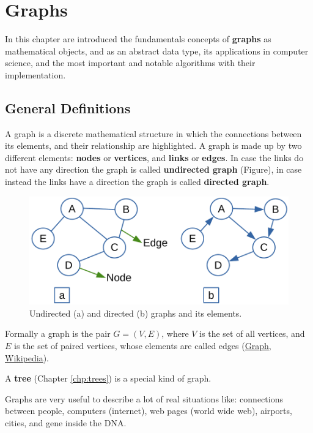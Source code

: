 \chapter{Graphs}
\label{chp:graphs}
In this chapter are introduced the fundamentals concepts of \textbf{graphs} as mathematical objects, and as an abstract data type, its applications in computer science, and the most important and notable algorithms with their implementation. 
 
\section{General Definitions}
A graph is a discrete mathematical structure in which the connections between its elements, and their relationship are highlighted. A graph is made up by two different elements: \textbf{nodes} or \textbf{vertices}, and \textbf{links} or \textbf{edges}. In case the links do not have any direction the graph is called \textbf{undirected graph} (Figure), in case instead the links have a direction the graph is called \textbf{directed graph}.

\begin{figure}[H]
	\begin{center}
		\includegraphics[scale=.6]{chapters/graphs/images/graphs_1.pdf}
		\caption[Undirected (a) and directed (b) graphs and its elements.]{Undirected (a) and directed (b) graphs and its elements.}
		\label{graphs_1}
	\end{center}
\end{figure}

Formally a graph is the pair \(G=(V, E)\), where \(V\) is the set of all vertices, and \(E\) is the set of paired vertices, whose elements are called edges \cite{wikigraphmath} (\href{https://en.wikipedia.org/wiki/Graph_(discrete_mathematics)}{Graph, Wikipedia}).

A \textbf{tree} (Chapter \ref{chp:trees}) is a special kind of graph.

Graphs are very useful to describe a lot of real situations like: connections between people, computers (internet), web pages (world wide web), airports, cities, and gene inside the DNA.

